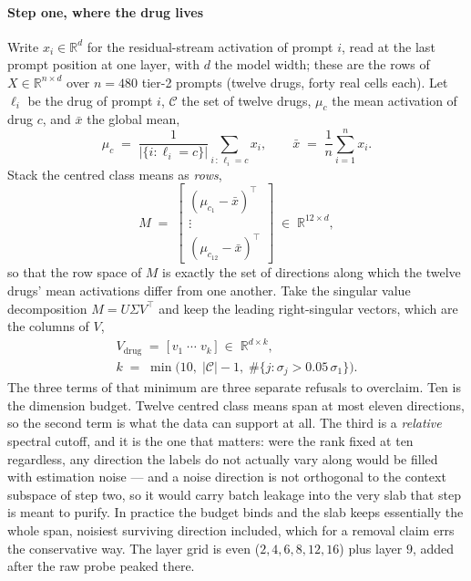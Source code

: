 \paragraph{Step one, where the drug lives} Write $x_i \in \mathbb{R}^{d}$ for
the residual-stream activation of prompt $i$, read at the last prompt position
at one layer, with $d$ the model width; these are the rows of
$X \in \mathbb{R}^{n \times d}$ over $n = \num{480}$ tier-2 prompts (twelve
drugs, forty real cells each). Let $\ell_i$ be the drug of prompt $i$,
$\mathcal{C}$ the set of twelve drugs, $\mu_c$ the mean activation of drug $c$,
and $\bar{x}$ the global mean,
\begin{equation}
  \mu_c \;=\; \frac{1}{|\{i : \ell_i = c\}|} \sum_{i \,:\, \ell_i = c} x_i ,
  \qquad
  \bar{x} \;=\; \frac{1}{n} \sum_{i=1}^{n} x_i .
\end{equation}
Stack the centred class means as \emph{rows},
\begin{equation}
  M \;=\;
  \begin{bmatrix}
    (\mu_{c_1} - \bar{x})^{\top} \\[2pt] \vdots \\[2pt]
    (\mu_{c_{12}} - \bar{x})^{\top}
  \end{bmatrix}
  \;\in\; \mathbb{R}^{12 \times d},
\end{equation}
so that the row space of $M$ is exactly the set of directions along which the
twelve drugs' mean activations differ from one another. Take the singular value
decomposition $M = U \Sigma V^{\top}$ and keep the leading right-singular
vectors, which are the columns of $V$,
\begin{equation}
\begin{gathered}
  V_{\textrm{drug}} \;=\; \big[\, v_1 \;\cdots\; v_k \,\big]
  \;\in\; \mathbb{R}^{d \times k},
  \\
  k \;=\; \min\!\big( 10,\; |\mathcal{C}| - 1,\;
          \#\{ j : \sigma_j > 0.05\,\sigma_1 \} \big).
\end{gathered}
\end{equation}
The three terms of that minimum are three separate refusals to overclaim. Ten is
the dimension budget. Twelve centred class means span at most eleven directions,
so the second term is what the data can support at all. The third is a
\emph{relative} spectral cutoff, and it is the one that matters: were the rank
fixed at ten regardless, any direction the labels do not actually vary along
would be filled with estimation noise --- and a noise direction is not
orthogonal to the context subspace of step two, so it would carry batch leakage
into the very slab that step is meant to purify. In practice the budget binds
and the slab keeps essentially the whole span, noisiest surviving direction
included, which for a removal claim errs the conservative way. The layer grid is
even ($2, 4, 6, 8, 12, 16$) plus layer $9$, added after the raw probe peaked
there.

